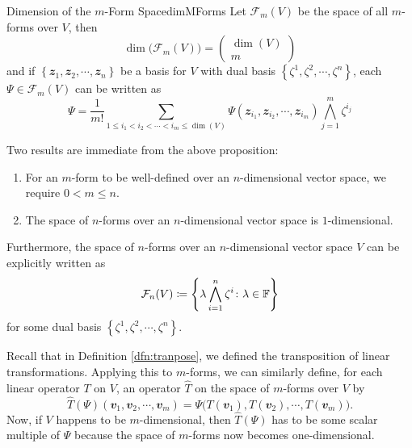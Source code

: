 \documentclass[math, code]{amznotes}
\theoremstyle{remark}
\begin{document}
\begin{probox}{Dimension of the $m$-Form Space}{dimMForms}
    Let $\mathcal{F}_m(V)$ be the space of all $m$-forms over $V$, then 
    \begin{equation*}
        \dim\bigl(\mathcal{F}_m(V)\bigr) = \begin{pmatrix}
            \dim(V) \\
            m
        \end{pmatrix}
    \end{equation*}
    and if  $\left\{\mathbfit{z}_1, \mathbfit{z}_2, \cdots, \mathbfit{z}_n\right\}$ be a basis for $V$ with dual basis $\left\{\zeta^1, \zeta^2, \cdots, \zeta^n\right\}$, each $\Psi \in \mathcal{F}_m(V)$ can be written as 
    \begin{equation*}
        \Psi = \frac{1}{m!}\sum_{1 \leq i_1 < i_2 < \cdots < i_m \leq \dim(V)}\Psi\left(\mathbfit{z}_{i_1}, \mathbfit{z}_{i_2}, \cdots, \mathbfit{z}_{i_m}\right)\bigwedge_{j = 1}^m\zeta^{i_j}
    \end{equation*}
\end{probox}
Two results are immediate from the above proposition:
\begin{enumerate}
    \item For an $m$-form to be well-defined over an $n$-dimensional vector space, we require $0 < m \leq n$.
    \item The space of $n$-forms over an $n$-dimensional vector space is $1$-dimensional.
\end{enumerate}
Furthermore, the space of $n$-forms over an $n$-dimensional vector space $V$ can be explicitly written as 
\begin{equation*}
    \mathcal{F}_n(V) \coloneqq \left\{\lambda\bigwedge_{i = 1}^n\zeta^i \colon \lambda \in \mathbb{F}\right\}
\end{equation*}
for some dual basis $\left\{\zeta^1, \zeta^2, \cdots, \zeta^n\right\}$.

Recall that in Definition \ref{dfn:tranpose}, we defined the transposition of linear transformations. Applying this to $m$-forms, we can similarly define, for each linear operator $T$ on $V$, an operator $\widehat{T}$ on the space of $m$-forms over $V$ by
\begin{equation*}
    \widehat{T}(\Psi)\left(\mathbfit{v}_1, \mathbfit{v}_2, \cdots, \mathbfit{v}_m\right) = \Psi\bigl(T(\mathbfit{v}_1), T(\mathbfit{v}_2), \cdots, T(\mathbfit{v}_m)\bigr).
\end{equation*}
Now, if $V$ happens to be $m$-dimensional, then $\widehat{T}(\Psi)$ has to be some scalar multiple of $\Psi$ because the space of $m$-forms now becomes one-dimensional.
\end{document}

